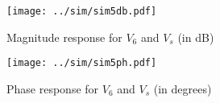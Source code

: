 \begin{figure}[!ht] \centering
\texttt{[image: ../sim/sim5db.pdf]}
\caption{Magnitude response for $V_{6}$ and $V_{s}$ (in dB)} 
\label{fig:sim5db}
\end{figure}

\begin{figure}[!ht] \centering
\texttt{[image: ../sim/sim5ph.pdf]}
\caption{Phase response for $V_{6}$ and $V_{s}$ (in degrees)} 
\label{fig:sim5ph}
\end{figure}




